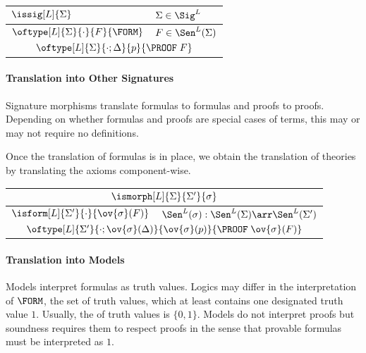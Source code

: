 \begin{center}
\begin{tabular}{|ll|}
\hline
$\issig[L]{\Sigma}$                      & {\color{gray}$\Sigma\in\Sig^L$} \\[.2cm]
\hline
$\oftype[L]{\Sigma}{\cdot}{F}{\FORM}$    & {\color{gray}$F\in\Sen^L(\Sigma)$} \\[.2cm]
\hline
\multicolumn{2}{|c|}{$\oftype[L]{\Sigma}{\cdot;\Delta}{p}{\PROOF\;F}$} 
\\[.2cm]
\hline
\end{tabular}
\end{center}

\paragraph{Translation into Other Signatures}
Signature morphisms translate formulas to formulas and proofs to proofs. Depending on whether formulas and proofs are special cases of terms, this may or may not require no definitions.

Once the translation of formulas is in place, we obtain the translation of theories by translating the axioms component-wise.

\begin{center}
\begin{tabular}{|ll|}
\hline
\multicolumn{2}{|c|}{$\ismorph[L]{\Sigma}{\Sigma'}{\sigma}$}\\[.2cm]
\hline
$\isform[L]{\Sigma'}{\cdot}{\ov{\sigma}(F)}$ & {\color{gray}$\Sen^L(\sigma):\Sen^L(\Sigma)\arr\Sen^L(\Sigma')$} \\[.2cm]
\hline
\multicolumn{2}{|c|}{$\oftype[L]{\Sigma'}{\cdot;\ov{\sigma}(\Delta)}{\ov{\sigma}(p)}{\PROOF\;\ov{\sigma}(F)}$}
\\[.2cm]
\hline
\end{tabular}
\end{center}

\paragraph{Translation into Models}
Models interpret formulas as truth values. Logics may differ in the interpretation of $\FORM$, the set of truth values, which at least contains one designated truth value $1$. Usually, the of truth values is $\{0,1\}$. Models do not interpret proofs but soundness requires them to respect proofs in the sense that provable formulas must be interpreted as $1$.

